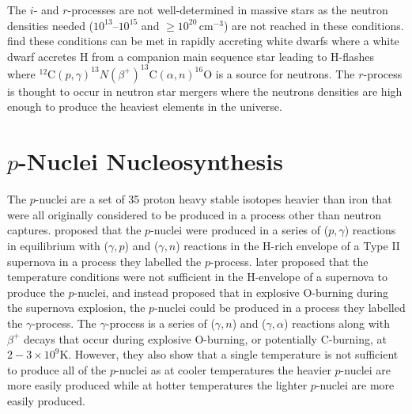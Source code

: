 The $i$- and $r$-processes are not well-determined in massive stars as the neutron densities needed ($10^{13}\text{–}10^{15}$ and $\geq 10^{20}\,\mathrm{cm}^{-3}$) are not reached in these conditions.
\cite{denissenkovImpactReactionRate2018,battinoHeavyElementsNucleosynthesis2020} find these conditions can be met in rapidly accreting white dwarfs where a white dwarf accretes H from a companion main sequence star leading to H-flashes where $^{12}\mathrm{C}(p,\gamma)^{13}N(\beta^+)^{13}\mathrm{C}(\alpha,n)^{16}\mathrm{O}$ is a source for neutrons.
The $r$-process is thought to occur in neutron star mergers \citep{mumpowerVdelayedFissionRprocess2018} where the neutrons densities are high enough to produce the heaviest elements in the universe.

\section{\texorpdfstring{$p$}{p}-Nuclei Nucleosynthesis}

The $p$-nuclei are a set of 35 proton heavy stable isotopes heavier than iron that were all originally considered to be produced in a process other than neutron captures.
\cite{burbidgeSynthesisElementsStars1957} proposed that the $p$-nuclei were produced in a series of ($p,\gamma$) reactions in equilibrium with ($\gamma,p
$) and ($\gamma,n$)  reactions in the H-rich envelope of a Type II supernova in a process they labelled the $p$-process.
\cite{woosleyPprocessesSupernovae1978} later proposed that the temperature conditions were not sufficient in the H-envelope of a supernova to produce the $p$-nuclei, and instead proposed that in explosive O-burning during the supernova explosion, the $p$-nuclei could be produced in a process they labelled the $\gamma$-process.
The $\gamma$-process is a series of ($\gamma,n$) and ($\gamma,\alpha$) reactions along with $\beta^+$ decays that occur during explosive O-burning, or potentially C-burning, at $2{-}3 \times 10^9 \mathrm{K}$.
However, they also show that a single temperature is not sufficient to produce all of the $p$-nuclei as at cooler temperatures the heavier $p$-nuclei are more easily produced while at hotter temperatures the lighter $p$-nuclei are more easily produced.

